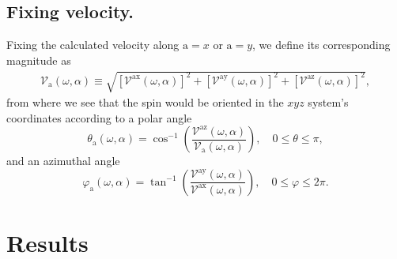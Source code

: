\documentclass[floatfix,prb,aps,superscriptaddress,showpacs,11pt,preprint,letterpaper]{revtex4}
\begin{document}
\subsection{Fixing velocity.}\label{sec:theory-fixvel}

Fixing the calculated velocity along $\mathrm{a}=x$ or $\mathrm{a}=y$,
we define its corresponding magnitude as
\begin{align}
\mathcal{V}_{\mathrm{a}}(\omega,\alpha) \equiv 
\sqrt { 
[\mathcal{V}^{\mathrm{ax}}(\omega,\alpha)]^{2} +
[\mathcal{V}^{\mathrm{ay}}(\omega,\alpha)]^{2} +
[\mathcal{V}^{\mathrm{az}}(\omega,\alpha)]^{2} 
},
\label{eq:vv-mag}
\end{align}
from where we see that the spin would be oriented in the $xyz$ system's
coordinates according to a polar angle
\begin{equation}
\theta_{\mathrm{a}}  (\omega,\alpha) = 
\cos^{-1} \left( \frac{\mathcal{V}^{\mathrm{az}}(\omega,\alpha)}
{\mathcal{V}_{\mathrm{a}}(\omega,\alpha)} \right),
 \quad 0 \leq \theta \leq \pi, 
\label{eq:polar-ang}
\end{equation}
and an azimuthal angle
\begin{equation}
\varphi_{\mathrm{a}} (\omega,\alpha) =
\tan^{-1} \left( \frac{\mathcal{V}^{\mathrm{ay}}(\omega,\alpha)}
{\mathcal{V}^{\mathrm{ax}}(\omega,\alpha)} \right),
\quad 0 \leq \varphi \leq 2\pi.
\label{eq:azimuthal-ang} 
\end{equation} 

\section{Results} %
\label{sec:results}
\end{document}
